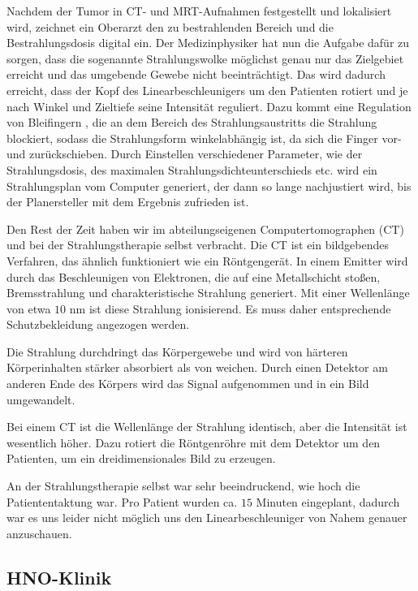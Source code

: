 \documentclass[11pt,a4paper,titlepage]{scrartcl}
\begin{document}
Nachdem der Tumor in CT- und MRT-Aufnahmen festgestellt und lokalisiert wird, zeichnet ein Oberarzt den zu bestrahlenden Bereich und die Bestrahlungsdosis digital ein.
Der Medizinphysiker hat nun die Aufgabe dafür zu sorgen, dass die sogenannte Strahlungswolke möglichst genau nur das Zielgebiet erreicht und das umgebende Gewebe nicht beeinträchtigt.
Das wird dadurch erreicht, dass der Kopf des Linearbeschleunigers um den Patienten rotiert und je nach Winkel und Zieltiefe seine Intensität reguliert.
Dazu kommt eine Regulation von \glq Bleifingern \grq, die an dem Bereich des Strahlungsaustritts die Strahlung blockiert, sodass die Strahlungsform winkelabhängig ist, da sich die Finger vor- und zurückschieben.
Durch Einstellen verschiedener Parameter, wie der Strahlungsdosis, des maximalen Strahlungsdichteunterschieds etc. wird ein Strahlungsplan vom Computer generiert, der dann so lange nachjustiert wird, bis der Planersteller mit dem Ergebnis zufrieden ist. \medskip

Den Rest der Zeit haben wir im abteilungseigenen Computertomographen (CT) und bei der Strahlungstherapie selbst verbracht.
Die CT ist ein bildgebendes Verfahren, das ähnlich funktioniert wie ein Röntgengerät.
In einem Emitter wird durch das Beschleunigen von Elektronen, die auf eine Metallschicht stoßen, Bremsstrahlung und charakteristische Strahlung generiert.
Mit einer Wellenlänge von etwa $10$ nm ist diese Strahlung ionisierend.
Es muss daher entsprechende Schutzbekleidung angezogen werden. \medskip

Die Strahlung durchdringt das Körpergewebe und wird von härteren Körperinhalten stärker absorbiert als von weichen.
Durch einen Detektor am anderen Ende des Körpers wird das Signal aufgenommen und in ein Bild umgewandelt. \medskip

Bei einem CT ist die Wellenlänge der Strahlung identisch, aber die Intensität ist wesentlich höher.
Dazu rotiert die Röntgenröhre mit dem Detektor um den Patienten, um ein dreidimensionales Bild zu erzeugen. \medskip

An der Strahlungstherapie selbst war sehr beeindruckend, wie hoch die Patiententaktung war.
Pro Patient wurden ca. $15$ Minuten eingeplant, dadurch war es uns leider nicht möglich uns den Linearbeschleuniger von Nahem genauer anzuschauen. \medskip

\subsection{HNO-Klinik}
\end{document}
